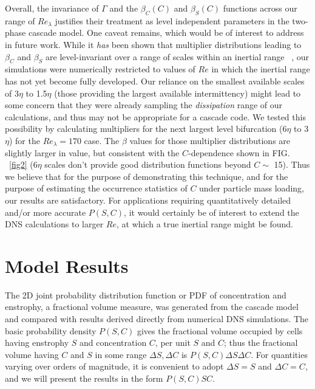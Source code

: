 \documentclass[aps,pra,twocolumn,groupedaddress,showkeys,showpacs,floatfix]{revtex4}
\begin{document}
  Overall, the invariance of $\Gamma$ and the $\beta_C(C)$ and $\beta_S(C)$ 
functions across our range of $Re_\lambda$ justifies their treatment as level 
independent parameters in the two-phase cascade model. 
One caveat remains, which would be of interest to address in future work. While
it {\it has} been shown that multiplier distributions leading to $\beta_C$ and
$\beta_S$ are level-invariant over a range of scales within an inertial range
~\cite{Sreenivasan:1}, our simulations were numerically restricted to values of $Re$ in which
the inertial range has not yet become fully developed. Our reliance on the
smallest available scales of 3$\eta$ to 1.5$\eta$ (those providing the largest
available intermittency) might lead to some concern that they were already
sampling the {\it dissipation} range of our calculations, and thus may not be
appropriate for a cascade code. We tested this possibility by calculating
multipliers for the next largest level bifurcation (6$\eta$ to 3$\eta$) for the
$Re_{\lambda}=170$ case. The $\beta$ values for those multiplier distributions
are slightly larger in value, but consistent with the $C$-dependence shown in
FIG. ~\ref{fig2} (6$\eta$ scales don't provide good distribution functions beyond $C
\sim$ 15). Thus we believe that for the purpose of demonstrating this
technique, and for the purpose of estimating the occurrence statistics of $C$
under particle mass loading, our results are satisfactory. For applications
requiring quantitatively detailed and/or more accurate $P(S,C)$, it would
certainly be of interest to extend the DNS calculations to larger $Re$, at
which a true inertial range might be found.   




\section { Model Results }

The 2D joint probability distribution function or PDF of concentration and
enstrophy, a fractional volume measure, was generated from the cascade model
and compared with results derived
directly from numerical DNS simulations. The basic probability density
$P(S,C)$ gives the fractional volume occupied by cells having enstrophy $S$ and
concentration $C$, per unit $S$ and $C$; thus the fractional volume having $C$
and $S$ in some range $\Delta S, \Delta C$ is $P(S,C) \Delta S \Delta C$.
For quantities varying over orders of magnitude, it is convenient to adopt
$\Delta S = S$ and $\Delta C = C$, and we will present the results in the
form $P(S,C)SC$.
                                                                        
\end{document}
